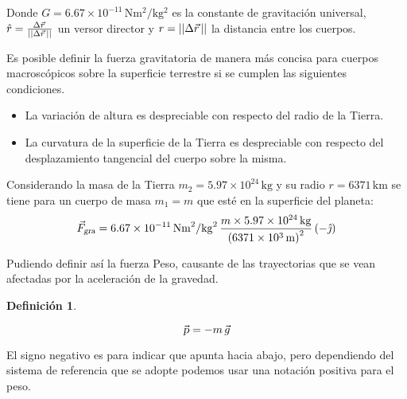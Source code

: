 \documentclass[a5paper,12pt,twoside]{book}
\newtheorem{defn}{{Definición}}[chapter]
\begin{document}
Donde $G = 6.67 \times 10^{-11} \, \si{\newton\metre^2\per\kilo\gram^2}$ es la constante de gravitación universal, $\hat{r}=\tfrac{\Delta \vec{r}\hspace{0.05cm}}{{\left|\left| {\Delta \vec{r}\hspace{0.05cm}} \right|\right|}}$ un versor director y $r={\left|\left| {\Delta \vec{r}\hspace{0.05cm}} \right|\right|}$ la distancia entre los cuerpos.

\begin{center}
    \vspace{-6cm}
    \def\svgwidth{\linewidth}
    
    \vspace{-6cm}
\end{center}

Es posible definir la fuerza gravitatoria de manera más concisa para cuerpos macroscópicos sobre la superficie terrestre si se cumplen las siguientes condiciones.
\begin{itemize}
    \item La variación de altura es despreciable con respecto del radio de la Tierra.
    \item La curvatura de la superficie de la Tierra es despreciable con respecto del desplazamiento tangencial del cuerpo sobre la misma.
\end{itemize}

Considerando la masa de la Tierra $m_2=5.97 \times 10^{24} \, \si{\kilo\gram}$ y su radio $r=6371 \, \si{\kilo\metre}$ se tiene para un cuerpo de masa $m_1=m$ que esté en la superficie del planeta:
\begin{equation*}
    {{\vec{F}}_\textsl{{gra}}} = 6.67 \times 10^{-11} \, \si{\newton\metre^2\per\kilo\gram^2} \, \frac{m \times 5.97 \times 10^{24} \, \si{\kilo\gram}}{\left(6371 \times 10^{3} \, \si{\metre}\right)^2} \left(-\hat{\jmath}\right)
\end{equation*}

Pudiendo definir así la fuerza Peso, causante de las trayectorias que se vean afectadas por la aceleración de la gravedad.

\begin{mdframed}[style=MyFrame1]
    \begin{defn}
        \label{defn:weightForce}
    \end{defn}
    \begin{equation*}
        \Vec{\textsl{p}} = -m \, \Vec{g}
    \end{equation*}
\end{mdframed}

El signo negativo es para indicar que apunta hacia abajo, pero dependiendo del sistema de referencia que se adopte podemos usar una notación positiva para el peso.
\end{document}
